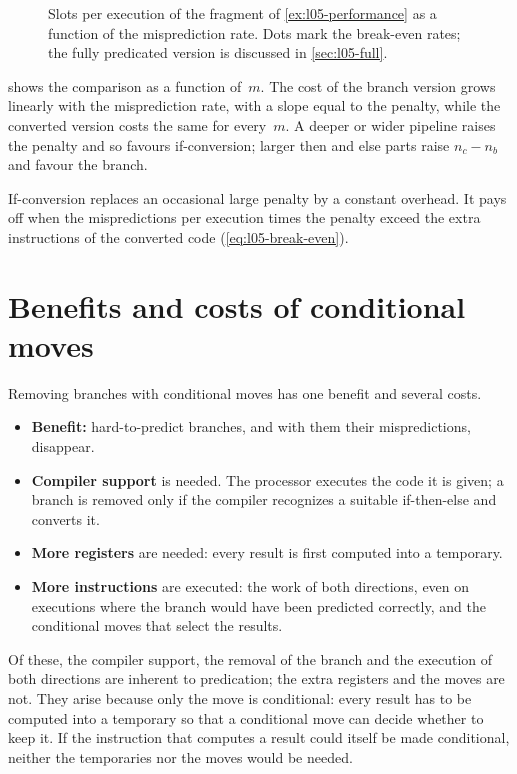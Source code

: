 \documentclass[../main.tex]{subfiles}
\begin{document}
\begin{figure}[htbp]
  \centering
  
  \caption{Slots per execution of the fragment of \cref{ex:l05-performance}
    as a function of the misprediction rate.  Dots mark the break-even
    rates; the fully predicated version is discussed in
    \cref{sec:l05-full}.}
  \label{fig:l05-break-even}
\end{figure}

 shows the comparison as a function of~$m$.  The
cost of the branch version grows linearly with the misprediction rate, with a
slope equal to the penalty, while the converted version costs the same for
every~$m$.  A deeper or wider pipeline raises the penalty and so favours
if-conversion; larger then and else parts raise $n_c - n_b$ and favour the
branch.

\begin{keypoint}
  If-conversion replaces an occasional large penalty by a constant overhead.
  It pays off when the mispredictions per execution times the penalty exceed
  the extra instructions of the converted code (\cref{eq:l05-break-even}).
\end{keypoint}

\section{Benefits and costs of conditional moves}
\label{sec:l05-cmov-summary}

Removing branches with conditional moves has one benefit and several
costs.
\begin{itemize}
  \item \textbf{Benefit:} hard-to-predict branches, and with them their
    mispredictions, disappear.
  \item \textbf{Compiler support} is needed.  The processor executes the code
    it is given; a branch is removed only if the compiler recognizes a
    suitable if-then-else and converts it.
  \item \textbf{More registers} are needed: every result is first computed
    into a temporary.
  \item \textbf{More instructions} are executed: the work of both directions,
    even on executions where the branch would have been predicted correctly,
    and the conditional moves that select the results.
\end{itemize}

Of these, the compiler support, the removal of the branch and the execution
of both directions are inherent to predication; the extra registers and the
moves are not.  They arise because only the move is conditional: every
result has to be computed into a temporary so that a conditional move can
decide whether to keep it.  If the instruction
that computes a result could itself be made conditional, neither the
temporaries nor the moves would be needed.
\end{document}
